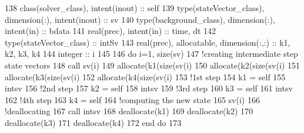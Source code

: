 \begin{DoxyCode}
138     \textcolor{keywordtype}{class}(solver\_class), \textcolor{keywordtype}{intent(inout)} :: self
139     \textcolor{keywordtype}{type}(stateVector\_class), \textcolor{keywordtype}{dimension(:)}, \textcolor{keywordtype}{intent(inout)} :: sv
140     \textcolor{keywordtype}{type}(background\_class), \textcolor{keywordtype}{dimension(:)}, \textcolor{keywordtype}{intent(in)} :: bdata
141     \textcolor{keywordtype}{real(prec)}, \textcolor{keywordtype}{intent(in)} :: time, dt
142     \textcolor{keywordtype}{type}(stateVector\_class) :: intSv
143     \textcolor{keywordtype}{real(prec)}, \textcolor{keywordtype}{allocatable}, \textcolor{keywordtype}{dimension(:,:)} :: k1, k2, k3, k4
144     \textcolor{keywordtype}{integer} :: i
145 
146     \textcolor{keywordflow}{do} i=1, \textcolor{keyword}{size}(sv)
147         \textcolor{comment}{!creating intermediate step state vectors}
148         \textcolor{keyword}{call }sv(i)%
149         \textcolor{keyword}{allocate}(k1(\textcolor{keyword}{size}(sv(i)%
150         \textcolor{keyword}{allocate}(k2(\textcolor{keyword}{size}(sv(i)%
151         \textcolor{keyword}{allocate}(k3(\textcolor{keyword}{size}(sv(i)%
152         \textcolor{keyword}{allocate}(k4(\textcolor{keyword}{size}(sv(i)%
153         \textcolor{comment}{!1st step}
154         k1 = self%
155         intsv%
156         \textcolor{comment}{!2nd step}
157         k2 = self%
158         intsv%
159         \textcolor{comment}{!3rd step}
160         k3 = self%
161         intsv%
162         \textcolor{comment}{!4th step}
163         k4 = self%
164         \textcolor{comment}{!computing the new state}
165         sv(i)%
166         \textcolor{comment}{!deallocating}
167         \textcolor{keyword}{call }intsv%
168         \textcolor{keyword}{deallocate}(k1)
169         \textcolor{keyword}{deallocate}(k2)
170         \textcolor{keyword}{deallocate}(k3)
171         \textcolor{keyword}{deallocate}(k4)
172 \textcolor{keywordflow}{    end do}
173 
\end{DoxyCode}
